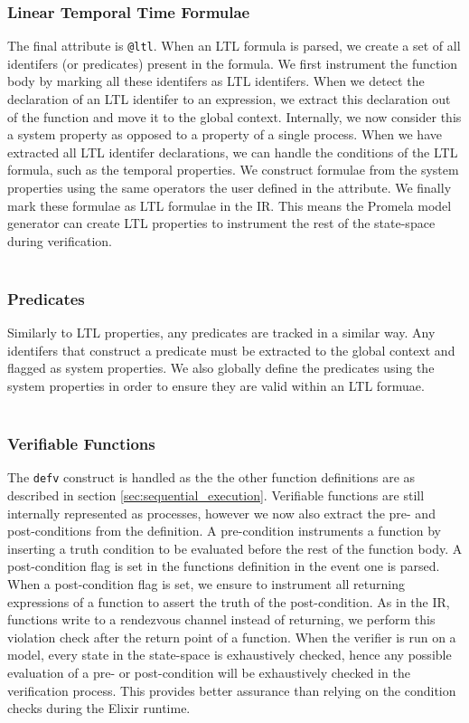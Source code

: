 \subsubsection{Linear Temporal Time Formulae}
The final attribute is \texttt{@ltl}. When an LTL formula is parsed, we create a set of all identifers (or predicates) present in the formula. We first instrument the function body by marking all these identifers as LTL identifers. When we detect the declaration of an LTL identifer to an expression, we extract this declaration out of the function and move it to the global context. Internally, we now consider this a system property as opposed to a property of a single process. When we have extracted all LTL identifer declarations, we can handle the conditions of the LTL formula, such as the temporal properties. We construct formulae from the system properties using the same operators the user defined in the attribute. We finally mark these formulae as LTL formulae in the IR. This means the Promela model generator can create LTL properties to instrument the rest of the state-space during verification.
\\ \\
\subsubsection{Predicates}
Similarly to LTL properties, any predicates are tracked in a similar way. Any identifers that construct a predicate must be extracted to the global context and flagged as system properties. We also globally define the predicates using the system properties in order to ensure they are valid within an LTL formuae.
\\ \\
\subsubsection{Verifiable Functions}
The \texttt{defv} construct is handled as the the other function definitions are as described in section \ref{sec:sequential_execution}. Verifiable functions are still internally represented as processes, however we now also extract the pre- and post-conditions from the definition. A pre-condition instruments a function by inserting a truth condition to be evaluated before the rest of the function body. A post-condition flag is set in the functions definition in the event one is parsed. When a post-condition flag is set, we ensure to instrument all returning expressions of a function to assert the truth of the post-condition. As in the IR, functions write to a rendezvous channel instead of returning, we perform this violation check after the return point of a function. When the verifier is run on a model, every state in the state-space is exhaustively checked, hence any possible evaluation of a pre- or post-condition will be exhaustively checked in the verification process. This provides better assurance than relying on the condition checks during the Elixir runtime.

